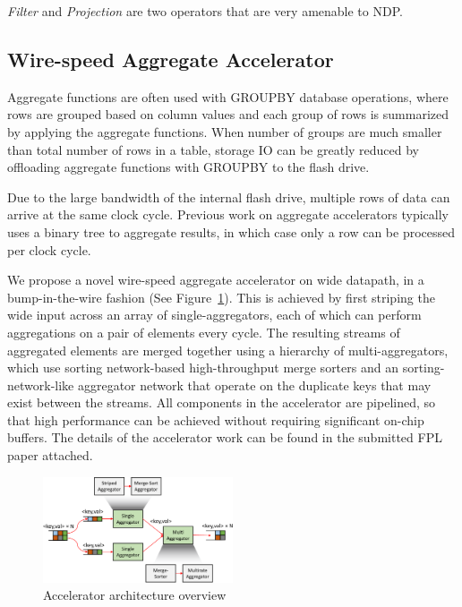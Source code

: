 \documentclass{article}
\newcommand{\filter}{\textit{Filter}\xspace}
\newcommand{\projection}{\textit{Projection}\xspace}
\begin{document}
\filter and \projection are two operators that are very amenable to NDP. 

\subsection{Wire-speed Aggregate Accelerator}
Aggregate functions are often used with GROUPBY database operations, where rows are grouped based on column values and each group of rows is summarized by applying the aggregate functions.
When number of groups are much smaller than total number of rows in a table, storage IO can be greatly reduced by offloading aggregate functions with GROUPBY to the flash drive.

Due to the large bandwidth of the internal flash drive, multiple rows of data can arrive at the same clock cycle.
Previous work on aggregate accelerators typically uses a binary tree to aggregate results, in which case only a row can be processed per clock cycle.

We propose a novel wire-speed aggregate accelerator on wide datapath, in a bump-in-the-wire fashion (See Figure~\ref{fig:arch-overview}).
This is achieved by first striping the wide input across an array of single-aggregators, each of which can perform aggregations on a pair of elements every cycle.
The resulting streams of aggregated elements are merged together using a hierarchy of multi-aggregators, which use sorting network-based high-throughput merge sorters and an sorting-network-like
aggregator network that operate on the duplicate keys that may exist between the streams.
All components in the accelerator are pipelined, so that high performance can be achieved without requiring significant on-chip buffers.
The details of the accelerator work can be found in the submitted FPL paper attached.

\begin{figure}[t]
    \centering
    \includegraphics[page=1, width=0.50\textwidth]{figures/figures-crop.pdf}
    \caption{Accelerator architecture overview}
    \label{fig:arch-overview}
	\vspace{-10pt}
\end{figure}
\end{document}
